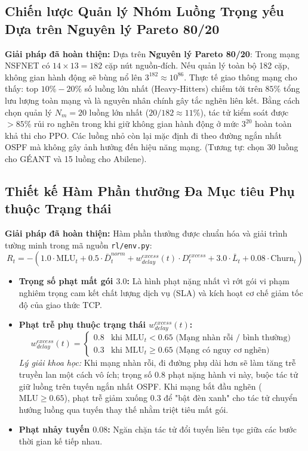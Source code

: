 \documentclass[11pt,a4paper]{article}
\begin{document}
\subsection{Chiến lược Quản lý Nhóm Luồng Trọng yếu Dựa trên Nguyên lý Pareto 80/20}
\textbf{Giải pháp đã hoàn thiện:} Dựa trên \textbf{Nguyên lý Pareto 80/20}:
Trong mạng NSFNET có $14 \times 13 = 182$ cặp nút nguồn-đích. Nếu quản lý toàn bộ 182 cặp, không gian hành động sẽ bùng nổ lên $3^{182} \approx 10^{86}$. Thực tế giao thông mạng cho thấy: top $10\% - 20\%$ số luồng lớn nhất (Heavy-Hitters) chiếm tới trên $85\%$ tổng lưu lượng toàn mạng và là nguyên nhân chính gây tắc nghẽn liên kết. Bằng cách chọn quản lý $N_m=20$ luồng lớn nhất ($20/182 \approx 11\%$), tác tử kiểm soát được $>85\%$ rủi ro nghẽn trong khi giữ không gian hành động ở mức $3^{20}$ hoàn toàn khả thi cho PPO. Các luồng nhỏ còn lại mặc định đi theo đường ngắn nhất OSPF mà không gây ảnh hưởng đến hiệu năng mạng. (Tương tự: chọn 30 luồng cho GÉANT và 15 luồng cho Abilene).

\subsection{Thiết kế Hàm Phần thưởng Đa Mục tiêu Phụ thuộc Trạng thái}
\textbf{Giải pháp đã hoàn thiện:} Hàm phần thưởng được chuẩn hóa và giải trình tường minh trong mã nguồn \texttt{rl/env.py}:
\begin{equation}
    R_t = -\left( 1.0 \cdot \text{MLU}_t + 0.5 \cdot \bar{D}_t^{norm} + w_{delay}^{excess}(t) \cdot D_t^{excess} + 3.0 \cdot \bar{L}_t + 0.08 \cdot \text{Churn}_t \right)
\end{equation}
\begin{itemize}
    \item \textbf{Trọng số phạt mất gói $3.0$:} Là hình phạt nặng nhất vì rớt gói vi phạm nghiêm trọng cam kết chất lượng dịch vụ (SLA) và kích hoạt cơ chế giảm tốc độ của giao thức TCP.
    \item \textbf{Phạt trễ phụ thuộc trạng thái $w_{delay}^{excess}(t)$:}
    $$w_{delay}^{excess}(t) = \begin{cases} 0.8 & \text{khi } \text{MLU}_t < 0.65 \text{ (Mạng nhàn rỗi / bình thường)} \\ 0.3 & \text{khi } \text{MLU}_t \ge 0.65 \text{ (Mạng có nguy cơ nghẽn)} \end{cases}$$
    \textit{Lý giải khoa học:} Khi mạng nhàn rỗi, đi đường phụ dài hơn sẽ làm tăng trễ truyền lan một cách vô ích; trọng số $0.8$ phạt nặng hành vi này, buộc tác tử giữ luồng trên tuyến ngắn nhất OSPF. Khi mạng bắt đầu nghẽn ($\text{MLU} \ge 0.65$), phạt trễ giảm xuống $0.3$ để "bật đèn xanh" cho tác tử chuyển hướng luồng qua tuyến thay thế nhằm triệt tiêu mất gói.
    \item \textbf{Phạt nhảy tuyến $0.08$:} Ngăn chặn tác tử đổi tuyến liên tục giữa các bước thời gian kế tiếp nhau.
\end{itemize}
\end{document}

